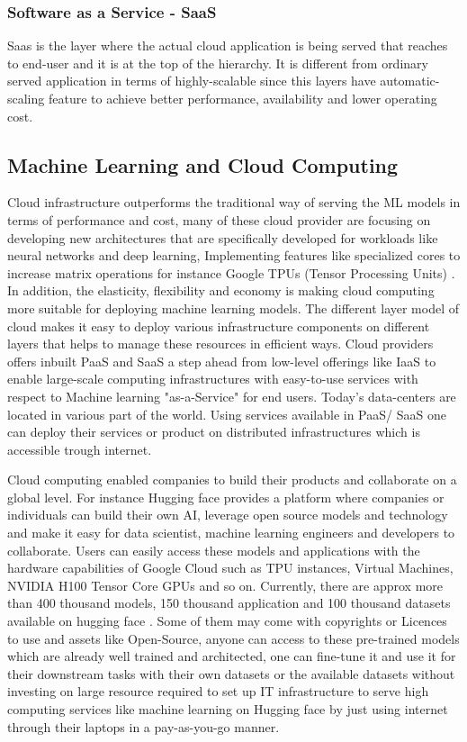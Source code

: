 \subsubsection{Software as a Service - SaaS}

Saas is the layer where the actual cloud application is being served that reaches to end-user and it is at the top of the hierarchy. It is different from ordinary served application in terms of highly-scalable since this layers have automatic-scaling feature to achieve better performance, availability and lower operating cost.

\subsection{Machine Learning and Cloud Computing}

Cloud infrastructure outperforms the traditional way of serving the ML models in terms of performance and cost, many of these cloud provider are focusing on developing new architectures that are specifically developed for workloads like neural networks and deep learning, Implementing features like specialized cores to increase matrix operations for instance Google TPUs (Tensor Processing Units) \cite{google_tpu}. In addition, the elasticity, flexibility and economy is making cloud computing more suitable for deploying machine learning models. The different layer model of cloud makes it easy to deploy various infrastructure components on different layers that helps to manage these resources in efficient ways. Cloud providers offers inbuilt PaaS and SaaS a step ahead from low-level offerings like IaaS to enable large-scale computing infrastructures with easy-to-use services with respect to Machine learning "as-a-Service" for end users. Today's data-centers are located in various part of the world. Using services available in PaaS/ SaaS one can deploy their services or product on distributed infrastructures which is accessible trough internet. 

Cloud computing enabled companies to build their products and collaborate on a global level. For instance Hugging face \cite{huggingfacehub} provides a platform where companies or individuals can build their own AI, leverage open source models and technology and make it easy for data scientist, machine learning engineers and developers to collaborate. Users can easily access these models and applications with the hardware capabilities of Google Cloud \cite{Googlecloud} such as TPU instances, Virtual Machines, NVIDIA H100 Tensor Core GPUs \cite{Nvidiagpu} and so on. Currently, there are approx more than 400 thousand models, 150 thousand application and 100 thousand datasets available on hugging face \cite{huggingfacehub}. Some of them may come with copyrights or Licences to use and assets like  Open-Source, anyone can access to these pre-trained models which are already well trained and architected, one can fine-tune it and use it for their downstream tasks with their own datasets or the available datasets without investing on large resource required to set up IT infrastructure to serve high computing services like machine learning on Hugging face by just using internet through their laptops in a pay-as-you-go manner.


